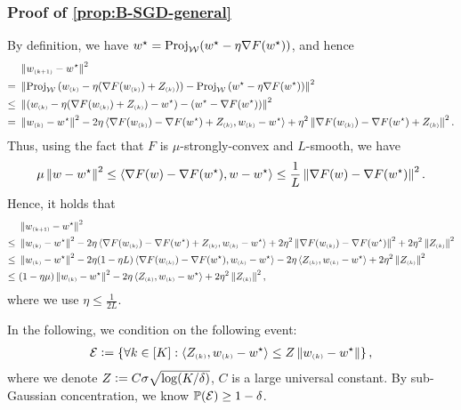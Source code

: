 \subsubsection{Proof of \cref{prop:B-SGD-general}}

By definition, we have $\us=\Proj_\cW(\us-\eta\nabla F(\us))$, and hence
\begin{align*}
    &~\nrm{w\iind{k+1}-\us}^2\\
    =&~
    \nrm{\Proj_\cW\paren{w\iind{k}-\eta \paren{\nabla F(w\iind{k}) + Z\iind{k}} }-\Proj_\cW\paren{\us-\eta\nabla F(\us)}}^2 \\
    \leq&~
    \nrm{\paren{w\iind{k}-\eta \paren{\nabla F(w\iind{k}) + Z\iind{k}}-\us}-\paren{\us-\nabla F(\us)}}^2 \\
    =&~ \nrm{w\iind{k}-\us}^2-2\eta\llr \nabla F(w\iind{k})-\nabla F(\us) + Z\iind{k}, w\iind{k}-\us \rrr +\eta^2\nrm{\nabla F(w\iind{k})-\nabla F(\us) + Z\iind{k}}^2.
\end{align*}
Thus, using the fact that $F$ is $\mu$-strongly-convex and $L$-smooth, we have
\begin{align*}
    \mu\nrm{w-\us}^2\leq \lr \nabla F(w)-\nabla F(\us), w-\us\rr \leq \frac{1}{L}\nrm{\nabla F(w)-\nabla F(\us)}^2.
\end{align*}
Hence, it holds that
\begin{align*}
    &~\nrm{w\iind{k+1}-\us}^2 \\
    \leq &~ \nrm{w\iind{k}-\us}^2-2\eta\llr \nabla F(w\iind{k})-\nabla F(\us) + Z\iind{k}, w\iind{k}-\us \rrr +2\eta^2\nrm{\nabla F(w\iind{k})-\nabla F(\us)}^2+2\eta^2 \nrm{Z\iind{k}}^2 \\
    \leq&~ \nrm{w\iind{k}-\us}^2-2\eta(1-\eta L)\llr \nabla F(w\iind{k})-\nabla F(\us), w\iind{k}-\us \rrr-2\eta \llr Z\iind{k}, w\iind{k}-\us \rrr +2\eta^2 \nrm{Z\iind{k}}^2 \\
    \leq&~ \paren{ 1-\eta\mu }\nrm{w\iind{k}-\us}^2-2\eta \llr Z\iind{k}, w\iind{k}-\us \rrr +2\eta^2 \nrm{Z\iind{k}}^2,
\end{align*}
where we use $\eta\leq \frac{1}{2L}$. 

In the following, we condition on the following event:
\begin{align*}
    \cE\defeq \sset{ \forall k\in[K]: \llr Z\iind{k}, w\iind{k}-\us \rrr\leq Z\nrm{w\iind{k}-\us} },
\end{align*}
where we denote $Z\defeq C\sigma\sqrt{\log(K/\delta)}$, $C$ is a large universal constant. By sub-Gaussian concentration, we know $\PP(\cE)\geq 1-\delta$.

